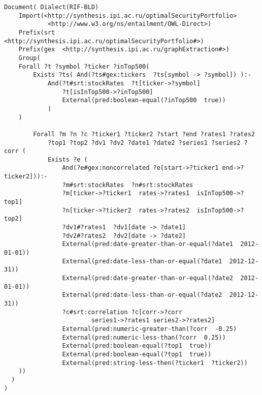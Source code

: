 {%



  \begin{verbatim}
Document( Dialect(RIF-BLD)
    Import(<http://synthesis.ipi.ac.ru/optimalSecurityPortfolio>
            <http://www.w3.org/ns/entailment/OWL-Direct>)
    Prefix(srt  <http://synthesis.ipi.ac.ru/optimalSecurityPortfolio#>)
    Prefix(gex  <http://synthesis.ipi.ac.ru/graphExtraction#>)
    Group(
    Forall ?t ?symbol ?ticker ?inTop500(
        Exists ?ts( And(?ts#gex:tickers  ?ts[symbol -> ?symbol]) ):-
            And(?t#srt:stockRates  ?t[ticker->?symbol]
                ?t[isInTop500->?inTop500]
                External(pred:boolean-equal(?inTop500  true))
            )
    )

        Forall ?m ?n ?с ?ticker1 ?ticker2 ?start ?end ?rates1 ?rates2
            ?top1 ?top2 ?dv1 ?dv2 ?date1 ?date2 ?series1 ?series2 ?corr (
            Exists ?e (
                And(?e#gex:noncorrelated ?e[start->?ticker1 end->?ticker2])):-
                ?m#srt:stockRates  ?n#srt:stockRates
                ?m[ticker->?ticker1  rates->?rates1  isInTop500->?top1]
                ?n[ticker->?ticker2  rates->?rates2  isInTop500->?top2]
                ?dv1#?rates1  ?dv1[date -> ?date1]
                ?dv2#?rates2  ?dv2[date -> ?date2]
                External(pred:date-greater-than-or-equal(?date1  2012-01-01))
                External(pred:date-less-than-or-equal(?date1  2012-12-31))
                External(pred:date-greater-than-or-equal(?date2  2012-01-01))
                External(pred:date-less-than-or-equal(?date2  2012-12-31))
                ?c#srt:correlation ?c[corr->?corr
                        series1->?rates1 series2->?rates2]
                External(pred:numeric-greater-than(?corr  -0.25)
                External(pred:numeric-less-than(?corr  0.25))
                External(pred:boolean-equal(?top1  true))
                External(pred:boolean-equal(?top1  true))
                External(pred:string-less-then(?ticker1  ?ticker2))
    ))
  )
)  
\end{verbatim}
}




